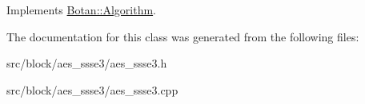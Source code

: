 Implements \hyperlink{classBotan_1_1Algorithm_a42d3ee39e051eba01ecace201fe1e6fd}{Botan\-::\-Algorithm}.



The documentation for this class was generated from the following files\-:\begin{DoxyCompactItemize}
\item 
src/block/aes\-\_\-ssse3/aes\-\_\-ssse3.\-h\item 
src/block/aes\-\_\-ssse3/aes\-\_\-ssse3.\-cpp\end{DoxyCompactItemize}
